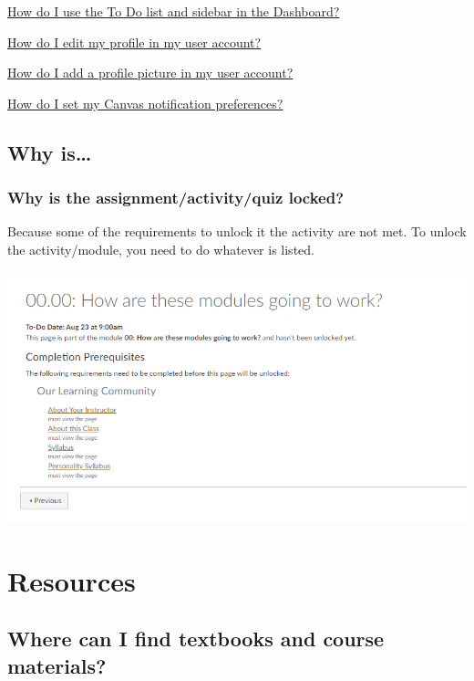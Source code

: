 \documentclass[
]{book}
\begin{document}
\href{https://community.canvaslms.com/docs/DOC-10589-4212717407}{How do I use the To Do list and sidebar in the Dashboard?}

\href{https://community.canvaslms.com/docs/DOC-10628-4212710342}{How do I edit my profile in my user account?}

\href{https://community.canvaslms.com/docs/DOC-10599-4212710334}{How do I add a profile picture in my user account?}

\href{https://community.canvaslms.com/docs/DOC-10624-4212710344}{How do I set my Canvas notification preferences?}

\hypertarget{why-is}{%
\subsection{Why is\ldots{}}\label{why-is}}

\hypertarget{why-is-the-assignmentactivityquiz-locked}{%
\subsubsection{Why is the assignment/activity/quiz locked?}\label{why-is-the-assignmentactivityquiz-locked}}

Because some of the requirements to unlock it the activity are not met. To unlock the activity/module, you need to do whatever is listed.

\begin{center}\includegraphics[width=0.5\linewidth]{img/requirements} \end{center}

\hypertarget{resources-1}{%
\section{Resources}\label{resources-1}}

\hypertarget{where-can-i-find-textbooks-and-course-materials}{%
\subsection{Where can I find textbooks and course materials?}\label{where-can-i-find-textbooks-and-course-materials}}
\end{document}
